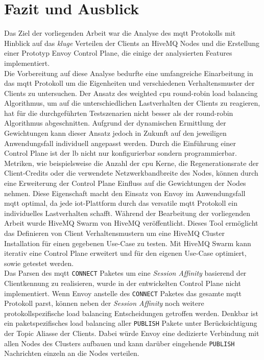 \section{Fazit und Ausblick}
Das Ziel der vorliegenden Arbeit war die Analyse des \ac{mqtt} Protokolls mit Hinblick auf das \textit{kluge} Verteilen der Clients an HiveMQ Nodes und die Erstellung einer Prototyp Envoy Control Plane, die einige der analysierten Features implementiert.
\\
Die Vorbereitung auf diese Analyse bedurfte eine umfangreiche Einarbeitung in das \ac{mqtt} Protokoll um die Eigenheiten und verschiedenen Verhaltensmuster der Clients zu untersuchen.
Der Ansatz des weighted \ac{cpu} round-robin load balancing Algorithmus, um auf die unterschiedlichen Lastverhalten der Clients zu reagieren, hat für die durchgeführten Testszenarien nicht besser als der round-robin Algorithmus abgeschnitten. Aufgrund der dynamischen Ermittlung der Gewichtungen kann dieser Ansatz jedoch in Zukunft auf den jeweiligen Anwendungsfall individuell angepasst werden.
Durch die Einführung einer Control Plane ist der \acl{lb} nicht nur konfigurierbar sondern programmierbar.
Metriken, wie beispielsweise die Anzahl der \ac{cpu} Kerne, die Regenerationsrate der Client-Credits oder die verwendete Netzwerkbandbreite des Nodes, können durch eine Erweiterung der Control Plane Einfluss auf die Gewichtungen der Nodes nehmen.
Diese Eigenschaft macht den Einsatz von Envoy im Anwendungsfall \ac{mqtt} optimal, da jede \ac{iot}-Plattform durch das versatile \ac{mqtt} Protokoll ein individuelles Lastverhalten schafft.
Während der Bearbeitung der vorliegenden Arbeit wurde HiveMQ Swarm von HiveMQ veröffentlicht. Dieses Tool ermöglicht das Definieren von Client Verhaltensmustern um eine HiveMQ Cluster Installation für einen gegebenen Use-Case zu testen.
Mit HiveMQ Swarm kann iterativ eine Control Plane erweitert und für den eigenen Use-Case optimiert, sowie getestet werden.
\\
Das Parsen des \ac{mqtt} \verb|CONNECT| Paketes um eine \textit{Session Affinity} basierend der Clientkennung zu realisieren, wurde in der entwickelten Control Plane nicht implementiert.
Wenn Envoy anstelle des \verb|CONNECT| Paketes das gesamte \ac{mqtt} Protokoll parst, können neben der \textit{Session Affinity} noch weitere protokollspezifische load balancing Entscheidungen getroffen werden.
Denkbar ist ein paketspezifisches load balancing aller \verb|PUBLISH| Pakete unter Berücksichtigung der Topic Aliasse der Clients. Dabei würde Envoy eine dedizierte Verbindung mit allen Nodes des Clusters aufbauen und kann darüber eingehende \verb|PUBLISH| Nachrichten einzeln an die Nodes verteilen.
